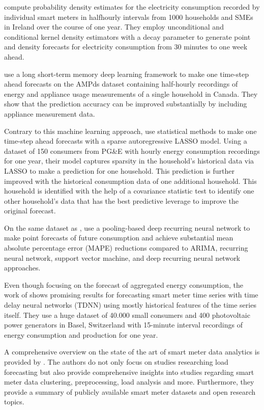 \citet{Arora:2016} compute probability density estimates for the electricity consumption recorded by individual smart meters in halfhourly intervals from 1000 households and SMEs in Ireland over the course of one year. They employ unconditional and conditional kernel density estimators with a decay parameter to generate point and density forecasts for electricity consumption from 30 minutes to one week ahead.

\citet{Kong:2018} use a long short-term memory deep learning framework to make one time-step ahead forecasts on the AMPds dataset containing half-hourly recordings of energy and appliance usage measurements of a single household in Canada. They show that the prediction accuracy can be improved substantially by including appliance measurement data.

Contrary to this machine learning approach, \citet{Li:2017} use statistical methods to make one time-step ahead forecasts with a sparse autoregressive LASSO model. Using a dataset of 150 consumers from PG\&E with hourly energy consumption recordings for one year, their model captures sparsity in the household’s historical data via LASSO to make a prediction for one household. This prediction is further improved with the historical consumption data of one additional household. This household is identified with the help of a covariance statistic test to identify one other household's data that has the best predictive leverage to improve the original forecast.

On the same dataset as \citet{Arora:2016}, \citet{Shi:2017} use a pooling-based deep recurring neural network to make point forecasts of future consumption and achieve substantial mean absolute percentage error (MAPE) reductions compared to ARIMA, recurring neural network, support vector machine, and deep recurring neural network approaches.

Even though focusing on the forecast of aggregated energy consumption, the work of \citet{Zufferey:2017} shows promising results for forecasting smart meter time series with time delay neural networks (TDNN) using mostly historical features of the time series itself. They use a huge dataset of 40.000 small consumers and 400 photovoltaic power generators in Basel, Switzerland with 15-minute interval recordings of energy consumption and production for one year.

A comprehensive overview on the state of the art of smart meter data analytics is provided by \citet{Wang:2018}. The authors do not only focus on studies researching load forecasting but also provide comprehensive insights into studies regarding smart meter data clustering, preprocessing, load analysis and more. Furthermore, they provide a summary of publicly available smart meter datasets and open research topics.

